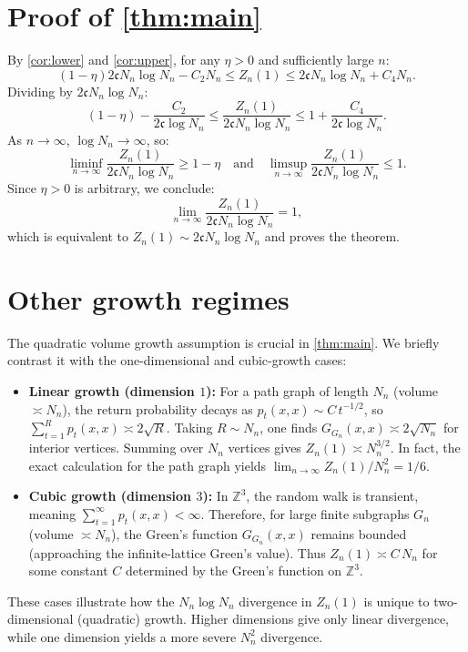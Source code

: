 \documentclass[11pt]{amsart}
\theoremstyle{remark}
\newcommand{\cG}{\mathfrak{c}}      %
\begin{document}
 

\section{Proof of \cref{thm:main}}
By \cref{cor:lower} and \cref{cor:upper}, for any $\eta > 0$ and sufficiently large $n$:
\[
  (1-\eta)2\cG N_n\log N_n - C_2 N_n 
  \leq Z_n(1) \leq 
  2\cG N_n\log N_n + C_4 N_n.
\]
Dividing by $2\cG N_n \log N_n$:
\[
  (1-\eta) - \frac{C_2}{2\cG \log N_n} 
  \leq \frac{Z_n(1)}{2\cG N_n \log N_n} 
  \leq 1 + \frac{C_4}{2\cG \log N_n}.
\]
As $n \to \infty$, $\log N_n \to \infty$, so:
\[
  \liminf_{n\to\infty} \frac{Z_n(1)}{2\cG N_n \log N_n} \geq 1-\eta
  \quad\text{and}\quad
  \limsup_{n\to\infty} \frac{Z_n(1)}{2\cG N_n \log N_n} \leq 1.
\]
Since $\eta > 0$ is arbitrary, we conclude:
\[
  \lim_{n\to\infty} \frac{Z_n(1)}{2\cG N_n \log N_n} = 1,
\]
which is equivalent to $Z_n(1) \sim 2\cG N_n \log N_n$ and proves the theorem.


\appendix

\section{Other growth regimes}\label{app:growth}
The quadratic volume growth assumption is crucial in \cref{thm:main}. We briefly contrast it with the one-dimensional and cubic-growth cases:
\begin{itemize}
\item \textbf{Linear growth (dimension $1$):} For a path graph of length $N_n$ (volume $\asymp N_n$), the return probability decays as $p_t(x,x) \sim C\,t^{-1/2}$, so $\sum_{t=1}^{R}p_t(x,x) \asymp 2\sqrt{R}$. Taking $R \sim N_n$, one finds $G_{G_n}(x,x) \asymp 2\sqrt{N_n}$ for interior vertices. Summing over $N_n$ vertices gives $Z_n(1) \asymp N_n^{3/2}$. In fact, the exact calculation for the path graph yields $\lim_{n\to\infty} Z_n(1)/N_n^2 = 1/6$.
\item \textbf{Cubic growth (dimension $3$):} In $\mathbb{Z}^3$, the random walk is transient, meaning $\sum_{t=1}^{\infty}p_t(x,x) < \infty$. Therefore, for large finite subgraphs $G_n$ (volume $\asymp N_n$), the Green's function $G_{G_n}(x,x)$ remains bounded (approaching the infinite-lattice Green's value). Thus $Z_n(1) \asymp C\,N_n$ for some constant $C$ determined by the Green's function on $\mathbb{Z}^3$.  
\end{itemize}
These cases illustrate how the $N_n \log N_n$ divergence in $Z_n(1)$ is unique to two-dimensional (quadratic) growth. Higher dimensions give only linear divergence, while one dimension yields a more severe $N_n^2$ divergence.
\end{document}
